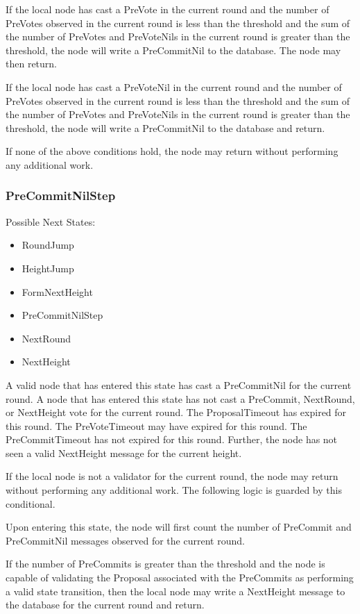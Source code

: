 If the local node has cast a PreVote in the current round and the
number of PreVotes observed in the current round is less than the
threshold and the sum of the number of PreVotes and PreVoteNils in the
current round is greater than the threshold, the node will write a
PreCommitNil to the database.
The node may then return.

If the local node has cast a PreVoteNil in the current round and the
number of PreVotes observed in the current round is less than the
threshold and the sum of the number of PreVotes and PreVoteNils in the
current round is greater than the threshold, the node will write a
PreCommitNil to the database and return.

If none of the above conditions hold, the node may return without
performing any additional work.


\subsubsection{PreCommitNilStep}

Possible Next States:

\begin{itemize}
    \item RoundJump
    \item HeightJump
    \item FormNextHeight
    \item PreCommitNilStep
    \item NextRound
    \item NextHeight
\end{itemize}

A valid node that has entered this state has cast a PreCommitNil for
the current round.
A node that has entered this state has not cast a PreCommit, NextRound,
or NextHeight vote for the current round.
The ProposalTimeout has expired for this round.
The PreVoteTimeout may have expired for this round.
The PreCommitTimeout has not expired for this round.
Further, the node has not seen a valid NextHeight message for the
current height.

If the local node is not a validator for the current round, the node
may return without performing any additional work.
The following logic is guarded by this conditional.

Upon entering this state, the node will first count the number of
PreCommit and PreCommitNil messages observed for the current round.

If the number of PreCommits is greater than the threshold and the node
is capable of validating the Proposal associated with the PreCommits as
performing a valid state transition, then the local node may write a
NextHeight message to the database for the current round and return.

